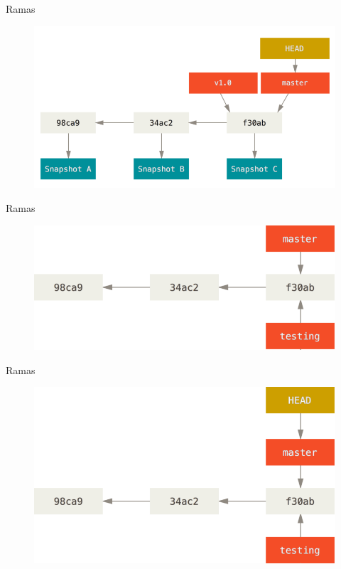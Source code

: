 \documentclass{beamer}
\begin{document}
\begin{frame}{Ramas}
\begin{figure}
	\centering
	\includegraphics[width=1\linewidth]{img/3}
	\label{fig:3}
\end{figure}
\end{frame}

\begin{frame}{Ramas}
\begin{figure}
	\centering
	\includegraphics[width=1\linewidth]{img/4}
	\label{fig:4}
\end{figure}
\end{frame}

\begin{frame}{Ramas}
\begin{figure}
	\centering
	\includegraphics[width=1\linewidth]{img/5}
	\label{fig:5}
\end{figure}	
\end{frame}
\end{document}
